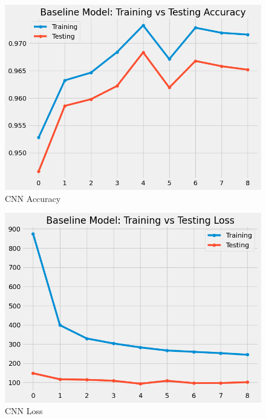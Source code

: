 \documentclass[a4paper,twoside,10pt]{article}
\begin{document}
\begin{figure}[H]
    \centering
    \includegraphics[scale=0.3]{Baseline CNN Acc}
    \caption{CNN Accuracy}
    \label{fig:cnn_accuracy}
\end{figure}

\begin{figure}[H]
    \centering
    \includegraphics[scale=0.3]{Baseline CNN Loss}
    \caption{CNN Loss}
    \label{fig:cnn_loss}
\end{figure}
\end{document}
